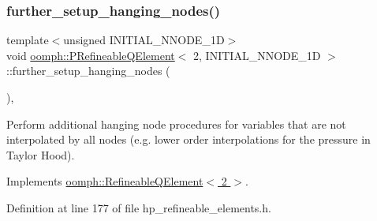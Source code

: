 \subsubsection{\texorpdfstring{further\+\_\+setup\+\_\+hanging\+\_\+nodes()}{further\_setup\_hanging\_nodes()}}
{\footnotesize\ttfamily template$<$unsigned I\+N\+I\+T\+I\+A\+L\+\_\+\+N\+N\+O\+D\+E\+\_\+1D$>$ \\
void \hyperlink{classoomph_1_1PRefineableQElement}{oomph\+::\+P\+Refineable\+Q\+Element}$<$ 2, I\+N\+I\+T\+I\+A\+L\+\_\+\+N\+N\+O\+D\+E\+\_\+1D $>$\+::further\+\_\+setup\+\_\+hanging\+\_\+nodes (\begin{DoxyParamCaption}{ }\end{DoxyParamCaption})\hspace{0.3cm}{\ttfamily [inline]}, {\ttfamily [virtual]}}



Perform additional hanging node procedures for variables that are not interpolated by all nodes (e.\+g. lower order interpolations for the pressure in Taylor Hood). 



Implements \hyperlink{classoomph_1_1RefineableQElement_3_012_01_4_a01e1eb063dd2c98ebb42d87959ca6b88}{oomph\+::\+Refineable\+Q\+Element$<$ 2 $>$}.



Definition at line 177 of file hp\+\_\+refineable\+\_\+elements.\+h.

\mbox{\label{classoomph_1_1PRefineableQElement_3_012_00_01INITIAL__NNODE__1D_01_4_a50a41c20cf1ab02ed17e1b74f571fd22}} 
